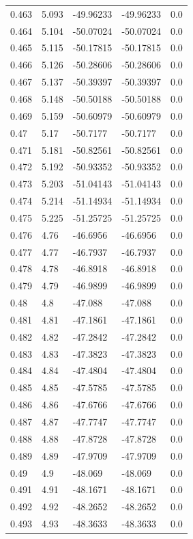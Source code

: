 \begin{tabular}{lllll}
0.463 & 5.093 & -49.96233 & -49.96233 & 0.0 \\
0.464 & 5.104 & -50.07024 & -50.07024 & 0.0 \\
0.465 & 5.115 & -50.17815 & -50.17815 & 0.0 \\
0.466 & 5.126 & -50.28606 & -50.28606 & 0.0 \\
0.467 & 5.137 & -50.39397 & -50.39397 & 0.0 \\
0.468 & 5.148 & -50.50188 & -50.50188 & 0.0 \\
0.469 & 5.159 & -50.60979 & -50.60979 & 0.0 \\
0.47 & 5.17 & -50.7177 & -50.7177 & 0.0 \\
0.471 & 5.181 & -50.82561 & -50.82561 & 0.0 \\
0.472 & 5.192 & -50.93352 & -50.93352 & 0.0 \\
0.473 & 5.203 & -51.04143 & -51.04143 & 0.0 \\
0.474 & 5.214 & -51.14934 & -51.14934 & 0.0 \\
0.475 & 5.225 & -51.25725 & -51.25725 & 0.0 \\
0.476 & 4.76 & -46.6956 & -46.6956 & 0.0 \\
0.477 & 4.77 & -46.7937 & -46.7937 & 0.0 \\
0.478 & 4.78 & -46.8918 & -46.8918 & 0.0 \\
0.479 & 4.79 & -46.9899 & -46.9899 & 0.0 \\
0.48 & 4.8 & -47.088 & -47.088 & 0.0 \\
0.481 & 4.81 & -47.1861 & -47.1861 & 0.0 \\
0.482 & 4.82 & -47.2842 & -47.2842 & 0.0 \\
0.483 & 4.83 & -47.3823 & -47.3823 & 0.0 \\
0.484 & 4.84 & -47.4804 & -47.4804 & 0.0 \\
0.485 & 4.85 & -47.5785 & -47.5785 & 0.0 \\
0.486 & 4.86 & -47.6766 & -47.6766 & 0.0 \\
0.487 & 4.87 & -47.7747 & -47.7747 & 0.0 \\
0.488 & 4.88 & -47.8728 & -47.8728 & 0.0 \\
0.489 & 4.89 & -47.9709 & -47.9709 & 0.0 \\
0.49 & 4.9 & -48.069 & -48.069 & 0.0 \\
0.491 & 4.91 & -48.1671 & -48.1671 & 0.0 \\
0.492 & 4.92 & -48.2652 & -48.2652 & 0.0 \\
0.493 & 4.93 & -48.3633 & -48.3633 & 0.0 \\

\end{tabular}
